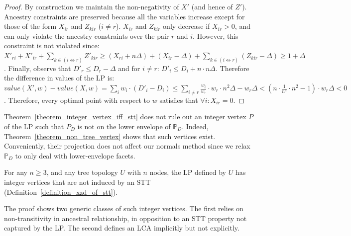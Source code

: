 \begin{proof}
By construction we maintain the non-negativity of $X'$ (and hence of $Z'$). Ancestry constraints are preserved because all the variables increase except for those of the form $X_{ir}$ and $Z_{kir}$ ($i \ne r$). $X_{ir}$ and $Z_{kir}$ only decrease if $X_{ir} > 0$, and can only violate the ancestry constraints over the pair $r$ and $i$. However, this constraint is not violated since: $X'_{ri} + X'_{ir} + \sum_{k \in (i \leftrightsquigarrow r)}{Z'_{kir}} \ge 
(X_{ri}+n\Delta) + (X_{ir}-\Delta) + \sum_{k \in (i \leftrightsquigarrow r)}{(Z_{kir} - \Delta)} \ge 1 + \Delta$. Finally, observe that $D'_r \le D_r - \Delta$ and for $i \ne r$: $D'_i \le D_i + n \cdot n\Delta$. Therefore the difference in values of the LP is:
$value(X',w) - value(X,w) = \sum_{i}{w_i \cdot (D'_i - D_i)} \le \sum_{i \ne r}{\frac{w_i}{w_r} \cdot w_r \cdot n^2 \Delta} - w_r \Delta < (n \cdot \frac{1}{n^4} \cdot n^2 - 1) \cdot w_r \Delta  < 0$. Therefore, every optimal point with respect to $w$ satisfies that $\forall i: X_{ir} = 0$.
\end{proof}


Theorem~\ref{theorem_integer_vertex_iff_stt} does not rule out an integer vertex $P$ of the LP such that $P_D$ is not on the lower envelope of $\mathbb{P}_D$. Indeed, Theorem~\ref{theorem_non_tree_vertex} shows that such vertices exist. Conveniently, their projection does not affect our normals method since we relax $\mathbb{P}_D$ to only deal with lower-envelope facets.

\begin{theorem}
\label{theorem_non_tree_vertex}
For any $n \ge 3$, and any tree topology $U$ with $n$ nodes, the LP defined by $U$ has integer vertices that are not induced by an STT (Definition~\ref{definition_xzd_of_stt}).
\end{theorem}

The proof shows two generic classes of such integer vertices. The first relies on non-transitivity in ancestral relationship, in opposition to an STT property not captured by the LP. The second defines an LCA implicitly but not explicitly.

